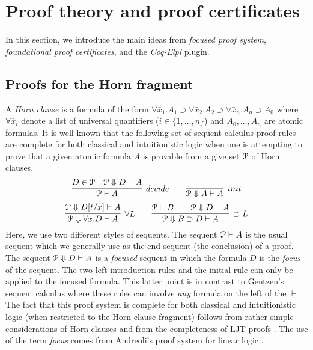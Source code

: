 \section{Proof theory and proof certificates}
\label{sec:three}

In this section, we introduce the main ideas from \emph{focused proof
  system}, \emph{foundational proof certificates}, and the
\emph{Coq-Elpi} plugin.

\subsection{Proofs for the Horn fragment}
\label{ssec:focused}


A \emph{Horn clause} is a formula of the form $\forall \bar
x_1. A_1\supset \forall \bar x_2. A_2\supset \forall \bar
x_n. A_n\supset A_0$ where $\forall\bar x_i$ denote a list of
universal quantifiers ($i\in\{1,\ldots,n\}$) and $A_0,\ldots,A_n$ are
atomic formulas.  It is well known that the following set of sequent
calculus proof rules are complete for both classical and
intuitionistic logic when one is attempting to prove that a given
atomic formula $A$ is provable from a give set ${\mathcal P}$ of Horn
clauses. 
\[
  \infer[decide]{\Pscr\vdash A}
                {D \in \Pscr\quad \Pscr\Downarrow D\vdash A}
  \qquad
  \infer[init]{\Pscr\Downarrow A\vdash A}{}
\]
\[
  \infer[\forall L]{\Pscr\Downarrow\forall x. D\vdash A}
        {\Pscr\Downarrow D[t/x]\vdash A}
  \qquad
  \infer[\supset L]{\Pscr\Downarrow B\supset D\vdash A}
        {\Pscr\vdash B\qquad \Pscr\Downarrow D\vdash A}
\]
Here, we use two different styles of sequents.  The sequent
${\mathcal P}\vdash A$ is the usual sequent which we generally use as the end
sequent (the conclusion) of a proof.  The sequent ${\mathcal P}\Downarrow
D\vdash A$ is a \emph{focused} sequent in which the formula $D$ is the
\emph{focus} of the sequent.  The two left introduction rules and the
initial rule can only be applied to the focused formula.  This latter
point is in contrast to Gentzen's sequent calculus where these rules
can involve \emph{any} formula on the left of the $\vdash$.  The fact
that this proof system is complete for both classical and
intuitionistic logic (when restricted to the Horn clause fragment)
follows from rather simple considerations of Horn clauses
\cite{nadathur90jacm} and from the completeness of LJT proofs
\cite{Herbelin94}.  The use of the term \emph{focus} comes from
Andreoli's proof system for linear logic \cite{andreoli92jlc}.

